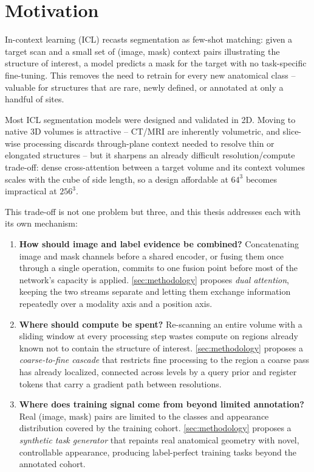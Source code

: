 \section{Motivation}\label{sec:motivation}

In-context learning (ICL) recasts segmentation as few-shot matching:
given a target scan and a small set of (image, mask) context pairs
illustrating the structure of interest, a model predicts a mask for the
target with no task-specific fine-tuning. This removes the need to
retrain for every new anatomical class -- valuable for structures that
are rare, newly defined, or annotated at only a handful of sites.

Most ICL segmentation models were designed and validated in 2D. Moving to
native 3D volumes is attractive -- CT/MRI are inherently volumetric, and
slice-wise processing discards through-plane context needed to resolve
thin or elongated structures -- but it sharpens an already difficult
resolution/compute trade-off: dense cross-attention between a target
volume and its context volumes scales with the cube of side length, so a
design affordable at $64^3$ becomes impractical at $256^3$.

This trade-off is not one problem but three, and this thesis addresses
each with its own mechanism:

\begin{enumerate}[leftmargin=1.6em,itemsep=0.2em]
  \item \textbf{How should image and label evidence be combined?}
    Concatenating image and mask channels before a shared encoder, or
    fusing them once through a single operation, commits to one fusion
    point before most of the network's capacity is applied.
    \autoref{sec:methodology} proposes \emph{dual attention}, keeping the
    two streams separate and letting them exchange information
    repeatedly over a modality axis and a position axis.
  \item \textbf{Where should compute be spent?} Re-scanning an entire
    volume with a sliding window at every processing step wastes compute
    on regions already known not to contain the structure of interest.
    \autoref{sec:methodology} proposes a \emph{coarse-to-fine cascade}
    that restricts fine processing to the region a coarse pass has
    already localized, connected across levels by a query prior and
    register tokens that carry a gradient path between resolutions.
  \item \textbf{Where does training signal come from beyond limited
    annotation?} Real (image, mask) pairs are limited to the classes and
    appearance distribution covered by the training cohort.
    \autoref{sec:methodology} proposes a \emph{synthetic task generator}
    that repaints real anatomical geometry with novel, controllable
    appearance, producing label-perfect training tasks beyond the
    annotated cohort.
\end{enumerate}

